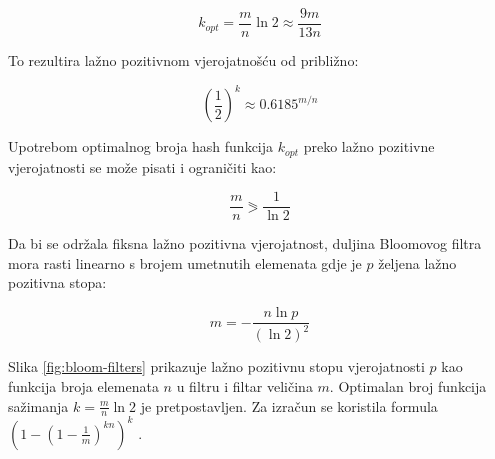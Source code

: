 \documentclass{foi}
\begin{document}
\begin{equation}\label{sesta_formula}
    k_{opt}=\frac{m}{n} \ln 2 \approx \frac{9m}{13n}
\end{equation}

To rezultira lažno pozitivnom vjerojatnošću od približno:

\begin{equation}\label{sedma_formula}
    \left( \frac{1}{2} \right)^k \approx 0.6185^{m/n}
\end{equation}

Upotrebom optimalnog broja hash funkcija $k_{opt}$ preko lažno pozitivne vjerojatnosti se može pisati i ograničiti kao:

\begin{equation}\label{osma_formula}
    \frac{m}{n} \eqslantgtr \frac{1}{ \ln 2}
\end{equation}

Da bi se održala fiksna lažno pozitivna vjerojatnost, duljina Bloomovog filtra mora rasti linearno s brojem umetnutih elemenata gdje je $p$ željena lažno pozitivna stopa:

\begin{equation}\label{deveta_formula}
    m=- \frac{n \ln p}{ \left( \ln 2 \right)^2  }
\end{equation}

Slika \ref*{fig:bloom-filters} prikazuje lažno pozitivnu stopu vjerojatnosti $p$ kao funkcija broja elemenata $n$ u filtru i filtar veličina $m$. Optimalan broj funkcija sažimanja $k = \frac{m}{n} \ln 2$ je pretpostavljen. Za izračun se koristila formula $\left( 1-\left( 1- \frac{1}{m} \right)^{kn}\right)^k$ \cite{tarkoma2011theory}.
\end{document}
